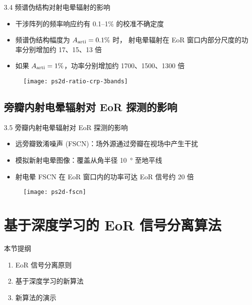 \documentclass{beamer}
\begin{document}
\begin{frame}{3.4 频谱伪结构对射电晕辐射的影响}
  \begin{itemize}
    \item 干涉阵列的频率响应约有 0.1--1\% 的校准不确定度
    \item 频谱伪结构幅度为 $A_{\text{arti}} = 0.1\%$ 时，
      射电晕辐射在 EoR 窗口内部分尺度的功率分别增加约 17、15、13 倍
    \item 如果 $A_{\text{arti}} = 1\%$，功率分别增加约 1700、1500、1300 倍
  \end{itemize}
  \begin{figure}
    \centering
    \texttt{[image: ps2d-ratio-crp-3bands]}
  \end{figure}
\end{frame}

\subsection{旁瓣内射电晕辐射对 EoR 探测的影响}

\begin{frame}{3.5 旁瓣内射电晕辐射对 EoR 探测的影响}
  \begin{itemize}
    \item \alert{远旁瓣致淆噪声 (FSCN)}：场外源通过旁瓣在视场中产生干扰
    \item 模拟新射电晕图像：覆盖从角半径 \SI{10}{\degree} 至地平线
    \item 射电晕 FSCN 在 EoR 窗口内的功率可达 EoR 信号约 20 倍
  \end{itemize}
  \begin{figure}
    \centering
    \texttt{[image: ps2d-fscn]}
  \end{figure}
\end{frame}


\section{基于深度学习的 EoR 信号分离算法}

\begin{frame}
  \begin{block}{本节提纲}
  \begin{enumerate}
    \item EoR 信号分离原则
    \item 基于深度学习的新算法
    \item 新算法的演示
  \end{enumerate}
  \end{block}
\end{frame}
\end{document}
